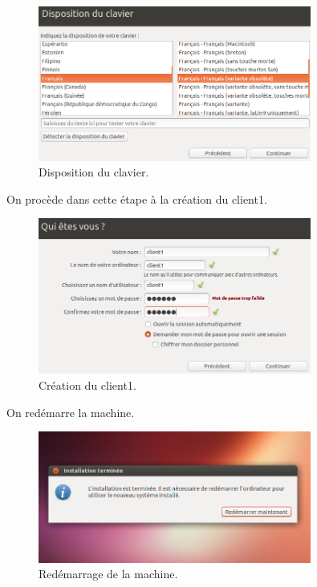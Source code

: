 \documentclass[11pt,a4paper,titlepage, oneside]{article}
\begin{document}
		 \begin{figure}[htp]
                        \centering
                        \includegraphics[width=0.8\textwidth,natwidth=610,natheight=642]{images/demarrerISO5.png}
                        \caption{Disposition du clavier.}
                \end{figure}


		On procède dans cette étape à la création du client1.	
		\begin{figure}[htp]
                        \centering
                        \includegraphics[width=0.8\textwidth,natwidth=610,natheight=642]{images/demarrerISO6.png}
                        \caption{Création du client1.}
                \end{figure}

		\newpage
		On redémarre la machine.

	\begin{figure}[htp]
                        \centering
                        \includegraphics[width=0.8\textwidth,natwidth=610,natheight=642]{images/demarrerISO7.png}
                        \caption{Redémarrage de la machine.}
                \end{figure}
	
\end{document}
